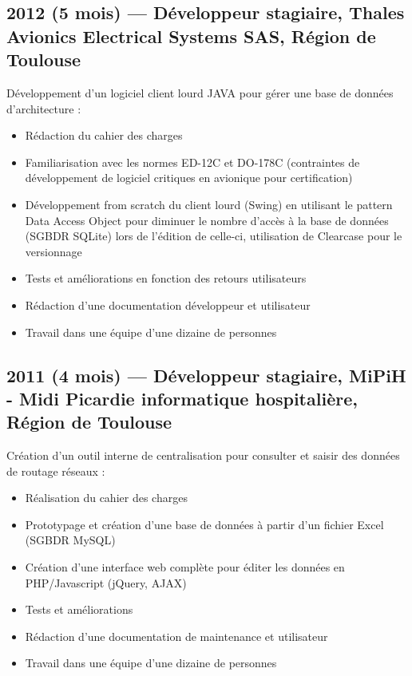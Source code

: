 \documentclass[11pt,a4paper,sans]{article} %
\begin{document}
\subsection{2012 (5 mois) --- Développeur stagiaire, Thales Avionics Electrical Systems SAS, Région de Toulouse}
Développement d'un logiciel client lourd JAVA pour gérer une base de données d'architecture :
\begin{itemize}
  \item Rédaction du cahier des charges
  \item Familiarisation avec les normes ED-12C et DO-178C (contraintes de développement de logiciel critiques en
        avionique pour certification)
  \item Développement from scratch du client lourd (Swing) en utilisant le pattern Data Access Object pour diminuer le
        nombre d'accès à la base de données (SGBDR SQLite) lors de l'édition de celle-ci, utilisation de Clearcase pour
        le versionnage
  \item Tests et améliorations en fonction des retours utilisateurs
  \item Rédaction d'une documentation développeur et utilisateur
  \item Travail dans une équipe d'une dizaine de personnes
\end{itemize}

\subsection{2011 (4 mois) --- Développeur stagiaire, MiPiH - Midi Picardie informatique hospitalière, Région de Toulouse}
Création d'un outil interne de centralisation pour consulter et saisir des données de routage réseaux :
\begin{itemize}
  \item Réalisation du cahier des charges
  \item Prototypage et création d'une base de données à partir d'un fichier Excel (SGBDR MySQL)
  \item Création d'une interface web complète pour éditer les données en PHP/Javascript (jQuery, AJAX)
  \item Tests et améliorations
  \item Rédaction d'une documentation de maintenance et utilisateur
  \item Travail dans une équipe d'une dizaine de personnes
\end{itemize}
\end{document}
